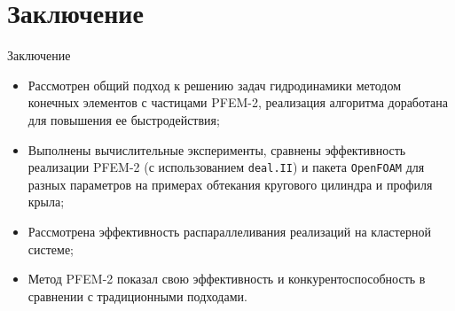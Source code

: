 \documentclass[9pt, ignoreonframetext,unicode]{beamer}
\begin{document}
\section{Заключение}
\begin{frame}{Заключение}
	\begin{itemize}
\item Рассмотрен общий подход к решению задач гидродинамики методом конечных элементов с частицами PFEM-2, реализация алгоритма доработана для повышения ее быстродействия;
\item Выполнены вычислительные эксперименты, сравнены эффективность реализации PFEM-2 (с использованием \texttt{deal.II}) и пакета \texttt{OpenFOAM} для разных параметров на примерах обтекания кругового цилиндра и профиля крыла;

\item Рассмотрена эффективность распараллеливания реализаций на кластерной системе;

\item Метод PFEM-2 показал свою эффективность и конкурентоспособность в сравнении с традиционными подходами.
	\end{itemize}
\end{frame}

%	
%
%
%
%
%
\end{document}

